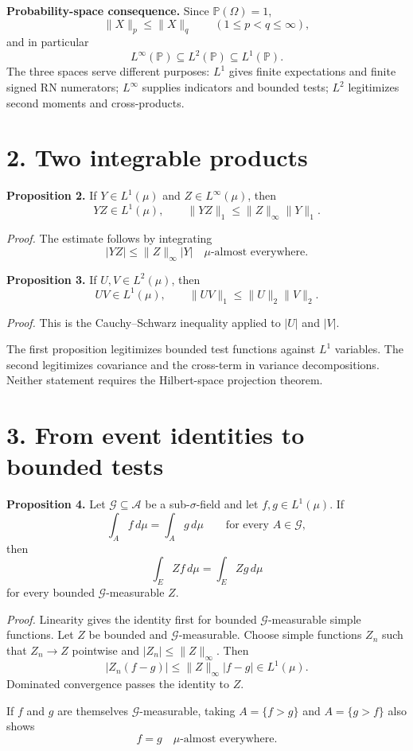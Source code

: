 \textbf{Probability-space consequence.}
Since $\mathbb P(\Omega)=1$,
\[
\|X\|_p\le\|X\|_q
\qquad(1\le p<q\le\infty),
\]
and in particular
\[
L^\infty(\mathbb P)
\subseteq
L^2(\mathbb P)
\subseteq
L^1(\mathbb P).
\]
The three spaces serve different purposes: $L^1$ gives finite expectations and finite signed RN numerators; $L^\infty$ supplies indicators and bounded tests; $L^2$ legitimizes second moments and cross-products.

\section*{2. Two integrable products}

\textbf{Proposition 2.}
If $Y\in L^1(\mu)$ and $Z\in L^\infty(\mu)$, then
\[
YZ\in L^1(\mu),
\qquad
\|YZ\|_1
\le
\|Z\|_\infty\|Y\|_1.
\]

\textit{Proof.}
The estimate follows by integrating
\[
|YZ|
\le
\|Z\|_\infty |Y|
\quad\mu\text{-almost everywhere}.
\]

\textbf{Proposition 3.}
If $U,V\in L^2(\mu)$, then
\[
UV\in L^1(\mu),
\qquad
\|UV\|_1\le\|U\|_2\|V\|_2.
\]

\textit{Proof.}
This is the Cauchy--Schwarz inequality applied to $|U|$ and $|V|$.

The first proposition legitimizes bounded test functions against $L^1$ variables. The second legitimizes covariance and the cross-term in variance decompositions. Neither statement requires the Hilbert-space projection theorem.

\section*{3. From event identities to bounded tests}

\textbf{Proposition 4.}
Let $\mathcal G\subseteq\mathcal A$ be a sub-$\sigma$-field and let $f,g\in L^1(\mu)$. If
\[
\int_A f\,d\mu
=
\int_A g\,d\mu
\qquad\text{for every }A\in\mathcal G,
\]
then
\[
\int_E Zf\,d\mu
=
\int_E Zg\,d\mu
\]
for every bounded $\mathcal G$-measurable $Z$.

\textit{Proof.}
Linearity gives the identity first for bounded $\mathcal G$-measurable simple functions. Let $Z$ be bounded and $\mathcal G$-measurable. Choose simple functions $Z_n$ such that $Z_n\to Z$ pointwise and $|Z_n|\le\|Z\|_\infty$. Then
\[
|Z_n(f-g)|
\le
\|Z\|_\infty|f-g|\in L^1(\mu).
\]
Dominated convergence passes the identity to $Z$.

If $f$ and $g$ are themselves $\mathcal G$-measurable, taking $A=\{f>g\}$ and $A=\{g>f\}$ also shows
\[
f=g\quad\mu\text{-almost everywhere}.
\]

